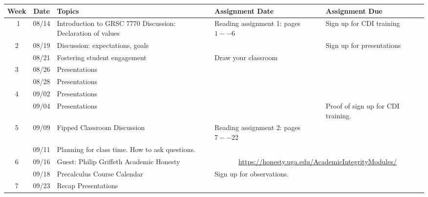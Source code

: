 \begin{longtable}{ |c|c|p{10em}|p{10em}|p{10em}| }
  \hline
  \textbf{Week} & \textbf{Date} & \textbf{Topics} & \textbf{Assignment Date} & \textbf{Assignment Due} \\
  \hline\ 
  1 & 08/14 & {Introduction to GRSC 7770 Discussion: Declaration of values} 
            & {Reading assignment 1:  pages $1--6$}
            & {Sign up for CDI training} \\  \hline
  
  2 & 08/19 &  {Discussion: expectations, goals}
            &
            & {Sign up for presentations}  \\ \hline
  
    & 08/21 & {Fostering student engagement}
            & {Draw your classroom}
            & \\ \hline

  3 & 08/26 & {Presentations}
            & {} 
            & \\ \hline

    & 08/28 &  {Presentations}
            & & {} \\ \hline

  4 & 09/02 & {Presentations} 
            & {} 
            & {}\\ \hline

    & 09/04 &  {Presentations} & {} & {Proof of sign up for CDI training.}\\ \hline


  5 & 09/09 & {Fipped Classroom Discussion}
            & {Reading assignment 2: pages $7--22$} 
            & {} \\ \hline 
  
    & 09/11 & {Planning for class time. How to ask questions.} 
            & {}
            & {} \\ \hline

  6 & 09/16 &  {Guest: Philip Griffeth Academic Honesty} 
            & \multicolumn{2}{c|}{\url{https://honesty.uga.edu/AcademicIntegrityModules/}}
            \\ \hline

    & 09/18 &  {Precalculus Course Calendar}
            & {Sign up for observations.} & {} \\ \hline

  7 & 09/23 & {Recap Presentations} 
            & {} 
            & {} \\ \hline


\end{longtable}

